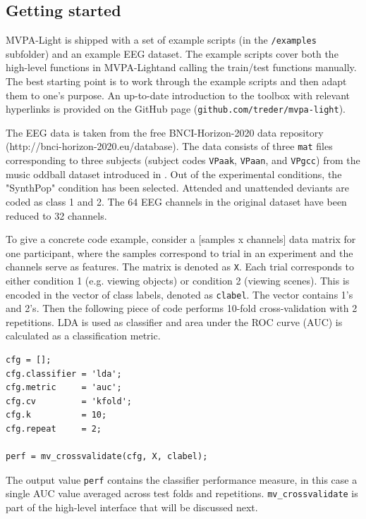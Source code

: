 \documentclass[utf8]{frontiersSCNS} %
\newcommand{\mvpa}{MVPA-Light}
\newcommand{\ttt}[1]{\texttt{#1}}
\begin{document}
\subsection{Getting started}

\mvpa{} is shipped with a set of example scripts (in the \ttt{/examples} subfolder) and an example EEG dataset. The example scripts cover both the high-level functions in \mvpa and calling the train/test functions manually. The best starting point is to work through the example scripts and then adapt them to one's purpose. An up-to-date introduction to the toolbox with relevant hyperlinks is provided on the GitHub page (\ttt{github.com/treder/mvpa-light}).

The EEG data is taken from the free BNCI-Horizon-2020 data repository (http://bnci-horizon-2020.eu/database). The data consists of three \ttt{mat} files corresponding to three subjects (subject codes \ttt{VPaak}, \ttt{VPaan}, and \ttt{VPgcc}) from the music oddball dataset introduced in \cite{Treder2014}. Out of the experimental conditions, the "SynthPop" condition has been selected. Attended and unattended deviants are coded as class 1 and 2. The 64 EEG channels in the original dataset have been reduced to 32 channels.

To give a concrete code example, consider a [samples x channels] data matrix for one participant, where the samples correspond to trial in an experiment and the channels serve as features. The matrix is denoted as \ttt{X}. Each trial corresponds to either condition 1 (e.g. viewing objects) or condition 2 (viewing scenes). This is encoded in the vector of class labels, denoted as \ttt{clabel}. The vector contains 1's and 2's. Then the following piece of code performs 10-fold cross-validation with 2 repetitions. LDA is used as classifier and area under the ROC curve (AUC) is calculated as a classification metric.

\begin{verbatim}
cfg = [];
cfg.classifier = 'lda';
cfg.metric     = 'auc';
cfg.cv         = 'kfold';
cfg.k          = 10;
cfg.repeat     = 2;

perf = mv_crossvalidate(cfg, X, clabel);
\end{verbatim}

The output value \ttt{perf} contains the classifier performance measure, in this case a single AUC value averaged across test folds and repetitions. \ttt{mv\_crossvalidate} is part of the high-level interface that will be discussed next.

\end{document}
